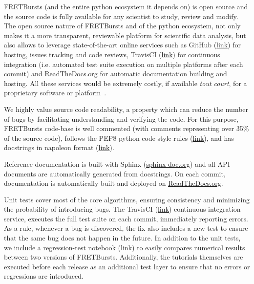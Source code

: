 FRETBursts (and the entire python ecosystem it depends on) is open source
and the source code is fully available for any scientist to study,
review and modify.
The open source nature of FRETBursts and of the python ecosystem,
not only makes it a more transparent, reviewable platform
for scientific data analysis, but also allows
to leverage state-of-the-art online services such as GitHub (\href{http://https://github.com}{link}) for hosting,
issues tracking and code reviews, TravisCI
(\href{https://travis-ci.org}{link}) for continuous integration
(i.e. automated test suite execution on multiple platforms after each commit)
and \href{https://readthedocs.org/}{ReadTheDocs.org} for automatic documentation building and hosting.
All these services would be extremely costly, if available \textit{tout court},
for a proprietary software or platform~\cite{Freeman_2015}.

We highly value source code readability, a property which can
reduce the number of bugs by facilitating understanding and verifying the code.
For this purpose, FRETBursts code-base is well commented (with comments representing over 35\%
of the source code),
follows the PEP8 python code style rules (\href{https://www.python.org/dev/peps/pep-0008/}{link}),
and has docstrings in napoleon format (\href{http://sphinxcontrib-napoleon.readthedocs.org/}{link}).

Reference documentation is built with Sphinx (\href{http://sphinx-doc.org/}{sphinx-doc.org})
and all API documents are automatically generated from docstrings.
On each commit, documentation is automatically built and deployed on
\href{https://readthedocs.org/}{ReadTheDocs.org}.

Unit tests cover most of the core algorithms, ensuring consistency and
minimizing the probability of introducing bugs.
The TravisCI (\href{http://travis-ci.org}{link}) continuous integration service,
executes the full test suite on each commit, immediately reporting errors.
As a rule, whenever a bug is discovered, the  fix also includes a new test
to ensure that the same bug does not happen in the future.
In addition to the unit tests, we include a regression-test notebook
(\href{https://github.com/tritemio/FRETBursts/blob/master/notebooks/dev/tests/FRETBursts%20-%20Regression%20tests.ipynb}{link})
to easily compares numerical results between two versions of FRETBursts.
Additionally, the tutorials themselves are executed before each release as
an additional test layer to ensure that no errors or regressions are introduced.


